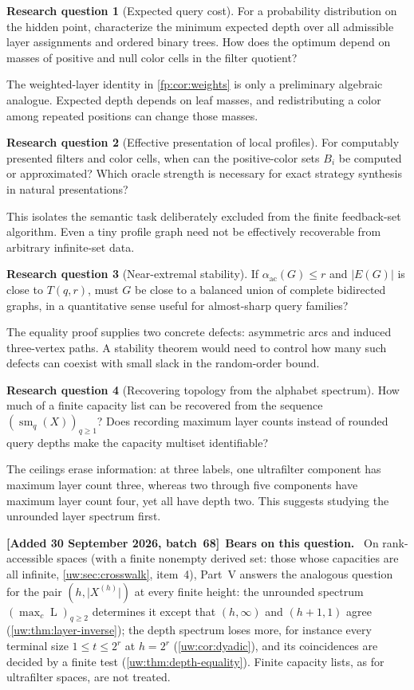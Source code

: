 \documentclass[11pt,letterpaper]{article}
\numberwithin{equation}{section}
\theoremstyle{definition}
\theoremstyle{remark}
\theoremstyle{definition}
\newtheorem{question}{Research question}
\newcommand{\sm}{\operatorname{sm}}
\newcommand{\layers}{\operatorname{L}}
\newcommand{\ac}{\alpha_{\mathrm{ac}}}
\newenvironment{writenotee}[1][]{\par\smallskip\begingroup\small\sloppy
 \noindent\textbf{[Added 30 September 2026, batch~68]}\if\relax\detokenize{#1}\relax\else~\textbf{#1.}\fi\ }%
 {\par\endgroup\smallskip}
\begin{document}
\begin{question}[Expected query cost]\label{fp:q:expected}
For a probability distribution on the hidden point, characterize the minimum
expected depth over all admissible layer assignments and ordered binary
trees. How does the optimum depend on masses of positive and null color
cells in the filter quotient?
\end{question}
The weighted-layer identity in \cref{fp:cor:weights} is only a preliminary
algebraic analogue. Expected depth depends on leaf masses, and redistributing
a color among repeated positions can change those masses.

\begin{question}[Effective presentation of local profiles]\label{fp:q:effective}
For computably presented filters and color cells, when can the positive-color
sets \(B_i\) be computed or approximated? Which oracle strength is necessary
for exact strategy synthesis in natural presentations?
\end{question}
This isolates the semantic task deliberately excluded from the finite
feedback-set algorithm. Even a tiny profile graph need not be effectively
recoverable from arbitrary infinite-set data.

\begin{question}[Near-extremal stability]\label{fp:q:stability}
If \(\ac(G)\leq r\) and \(|E(G)|\) is close to \(T(q,r)\), must
\(G\) be close to a balanced union of complete bidirected graphs, in a
quantitative sense useful for almost-sharp query families?
\end{question}
The equality proof supplies two concrete defects: asymmetric arcs and
induced three-vertex paths. A stability theorem would need to control how
many such defects can coexist with small slack in the random-order bound.

\begin{question}[Recovering topology from the alphabet spectrum]\label{fp:q:spectrum}
How much of a finite capacity list can be recovered from the sequence
\((\sm_q(X))_{q\geq1}\)? Does recording maximum layer counts instead
of rounded query depths make the capacity multiset identifiable?
\end{question}
The ceilings erase information: at three labels, one ultrafilter component
has maximum layer count three, whereas two through five components have
maximum layer count four, yet all have depth two. This suggests studying
the unrounded layer spectrum first.

\begin{writenotee}[Bears on this question]
On rank-accessible spaces (with a finite nonempty derived set: those whose
capacities are all infinite, \cref{uw:sec:crosswalk}, item~4), Part~V
answers the analogous question for the pair $(h,\lvert
X^{(h)}\rvert)$ at every finite height: the unrounded spectrum
$(\max_c\layers)_{q\ge2}$ determines it except that $(h,\infty)$ and
$(h+1,1)$ agree (\cref{uw:thm:layer-inverse}); the depth spectrum loses
more, for instance every terminal size $1\le t\le2^r$ at $h=2^r$
(\cref{uw:cor:dyadic}), and its coincidences are decided by a finite test
(\cref{uw:thm:depth-equality}). Finite capacity lists, as for ultrafilter
spaces, are not treated.
\end{writenotee}
\end{document}

